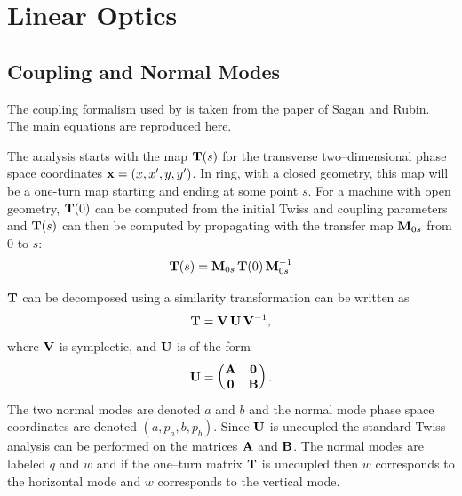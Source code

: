 \chapter{Linear Optics}

\section{Coupling and Normal Modes}
\label{s:coupling}

The coupling formalism used by \bmad is taken from the paper of Sagan and Rubin\cite{b:coupling}.
The main equations are reproduced here.

The analysis starts with the map ${\bf T}(s)$ for the transverse two--dimensional phase space
coordinates ${\bf x} = (x, x', y, y')$. In ring, with a closed geometry, this map will be a one-turn
map starting and ending at some point $s$. For a machine with open geometry, ${\bf T}(0)$ can be
computed from the initial Twiss and coupling parameters and ${\bf T}(s)$ can then be computed by
propagating with the transfer map ${\bf M}_{0s}$ from $0$ to $s$:
\begin{equation}
    {\bf T}(s) = {\bf M}_{0s} \, {\bf T}(0) \, {\bf M}_{0s}^{-1}
\end{equation}

${\bf T}$ can be decomposed using a similarity transformation
 can be written as
  \begin{equation}
    {\bf T} = {\bf V} \, {\bf U} \, {\bf V}^{-1} 
    , \label{tvuv}
  \end{equation} 
where ${\bf V}$ is symplectic, and ${\bf U}$ is of the form
  \begin{equation}
    {\bf U} = 
    \begin{pmatrix}
      {\bf A} & {\bf 0} \cr 
      {\bf 0} & {\bf B} \cr
    \end{pmatrix}
    . \label{ua00b}
  \end{equation}
The two normal modes are denoted $a$ and $b$ and the normal mode phase space coordinates are denoted
$(a, p_a, b, p_b)$.
Since ${\bf U}$ is uncoupled the standard Twiss analysis can be performed on the matrices
${\bf A}$ and ${\bf B}$. The normal modes are labeled $q$ and $w$ and if the one--turn matrix
${\bf T}$ is uncoupled then $w$ corresponds to the horizontal mode and $w$ corresponds to the
vertical mode.

